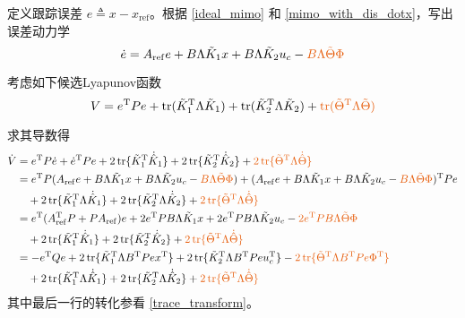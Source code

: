 定义跟踪误差 $e \triangleq x -
x_{\ensuremath{\operatorname{ref}}}$。根据 \eqref{ideal_mimo} 和 \eqref{mimo_with_dis_dotx}，写出误差动力学
\begin{equation}
  \dot{e} = A_{\ensuremath{\operatorname{ref}}} e + B \Lambda  \tilde{K}_1 x +
  B \Lambda  \tilde{K}_2 u_c-\textcolor{second}{B\Lambda \tilde{\Theta}\Phi} \label{errsys_with_dis:MRAC:GLS}
\end{equation}

考虑如下候选Lyapunov函数
\begin{equation}
  V=e^\mathrm{T}Pe+\tr(\tilde{K}_1^\mathrm{T}{\Lambda}\tilde{K}_1)+\tr(\tilde{K}_2^\mathrm{T}{\Lambda}\tilde{K}_2)+\textcolor{second}{\tr (\tilde{\Theta}^\mathrm{T}{\Lambda}\tilde{\Theta})}
\end{equation}

求其导数得
\begin{align}
  \dot{V} & =e^\mathrm{T}P\dot{e}+\dot{e}^\mathrm{T}Pe + 2\tr \{
  \tilde{K}^\mathrm{T}_1 \dot{\hat{K}} _1 \} + 2\tr
  \{ \tilde{K}^\mathrm{T}_2 \dot{\hat{K}} _2 \}+\textcolor{second}{2\tr \{ \tilde{\Theta}^\mathrm{T} \Lambda\dot{\hat{\Theta}} \}}\nonumber\\
  & = e^\mathrm{T}P( A_{\ensuremath{\operatorname{ref}}} e + B \Lambda  \tilde{K}_1 x +
  B \Lambda  \tilde{K}_2 u_c-\textcolor{second}{B\Lambda \tilde{\Theta}\Phi})+(A_{\ensuremath{\operatorname{ref}}} e + B \Lambda  \tilde{K}_1 x +
  B \Lambda  \tilde{K}_2 u_c-\textcolor{second}{B\Lambda \tilde{\Theta}\Phi})^\mathrm{T}Pe\nonumber\\
  &\quad+
  2\tr \{ \tilde{K}^\mathrm{T}_1 \Lambda\dot{\hat{K}} _1 \}
  + 2\tr \{ \tilde{K}^\mathrm{T}_2 \Lambda\dot{\hat{K}} _2 \}+\textcolor{second}{2\tr \{ \tilde{\Theta}^\mathrm{T} \Lambda\dot{\hat{\Theta}} \}}\nonumber\\
  &= e^\mathrm{T}(A_{\ensuremath{\operatorname{ref}}}^\mathrm{T} P + P A_{\ensuremath{\operatorname{ref}}}) e+ 2 e^\mathrm{T}  P  B \Lambda 
  \tilde{K}_1 x + 2 e^\mathrm{T} P  B \Lambda  \tilde{K}_2 u_c -\textcolor{second}{2 e^\mathrm{T}PB\Lambda \tilde{\Theta}\Phi}\nonumber\\
  &\quad +  2\tr \{ \tilde{K}^\mathrm{T}_1  \dot{\hat{K}} _1 \}
  + 2\tr \{ \tilde{K}^\mathrm{T}_2  \dot{\hat{K}} _2
  \}+\textcolor{second}{2\tr \{ \tilde{\Theta}^\mathrm{T} \Lambda\dot{\hat{\Theta}} \}}\nonumber\\
  & = -e^\mathrm{T}Q e +
  2\tr \{ \tilde{K}^\mathrm{T}_1 \Lambda B^\mathrm{T}  P  e  x^\mathrm{T} \} +
  2\tr \{ \tilde{K}^\mathrm{T}_2 \Lambda B^\mathrm{T}  P  e  u_c^\mathrm{T} \} - \textcolor{second}{2\tr \{ \tilde{\Theta}^\mathrm{T} \Lambda B^\mathrm{T}Pe\Phi^\mathrm{T}
  \}}\nonumber\\
  &\quad + 2\tr \{ \tilde{K}^\mathrm{T}_1  \Lambda\dot{\hat{K}} _1 \}
  + 2\tr \{ \tilde{K}^\mathrm{T}_2  \Lambda \dot{\hat{K}} _2\}+\textcolor{second}{2\tr \{ \tilde{\Theta}^\mathrm{T} \Lambda\dot{\hat{\Theta}} \}}\label{pro_dot_V_modify}
\end{align}
其中最后一行的转化参看 \eqref{trace_transform}。

